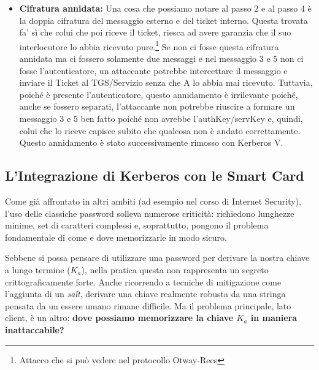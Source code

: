 \begin{itemize}
    Quando B si trova davanti quella servK, poiché sa che vale che $Ts + Ls \leq Ta + La$\footnote{Ts è il tempo in cui è stata generata la servK mentre Ls è il suo lifetime. Allo stesso modo vale per Ta ed La.}, sa che non può essere scaduta.
    \item \textbf{Cifratura annidata: }Una cosa che possiamo notare al passo 2 e al passo 4 è la doppia cifratura del messaggio esterno e del ticket interno. Questa trovata fa' sì che colui che poi riceve il ticket, riesca ad avere garanzia che il suo interlocutore lo abbia ricevuto pure.\footnote{Attacco che si può vedere nel protocollo Otway-Rees} Se non ci fosse questa cifratura annidata ma ci fossero solamente due messaggi e nel messaggio 3 e 5 non ci fosse l'autenticatore, un attaccante potrebbe intercettare il messaggio e inviare il Ticket al TGS/Servizio senza che A lo abbia mai ricevuto. Tuttavia, poiché è presente l'autenticatore, questo annidamento è irrilevante poiché, anche se fossero separati, l'attaccante non potrebbe riuscire a formare un messaggio 3 e 5 ben fatto poiché non avrebbe l'authKey/servKey e, quindi, colui che lo riceve capisce subito che qualcosa non è andato correttamente. Questo annidamento è stato successivamente rimosso con Kerberos V.
\end{itemize}
\subsection{L'Integrazione di Kerberos con le Smart Card}

Come già affrontato in altri ambiti (ad esempio nel corso di Internet Security), l'uso delle classiche password solleva numerose criticità: richiedono lunghezze minime, set di caratteri complessi e, soprattutto, pongono il problema fondamentale di come e dove memorizzarle in modo sicuro. 

Sebbene si possa pensare di utilizzare una password per derivare la nostra chiave a lungo termine ($K_a$), nella pratica questa non rappresenta un segreto crittograficamente forte. Anche ricorrendo a tecniche di mitigazione come l'aggiunta di un \textit{salt}, derivare una chiave realmente robusta da una stringa pensata da un essere umano rimane difficile. Ma il problema principale, lato client, è un altro: \textbf{dove possiamo memorizzare la chiave $K_a$ in maniera inattaccabile?}


